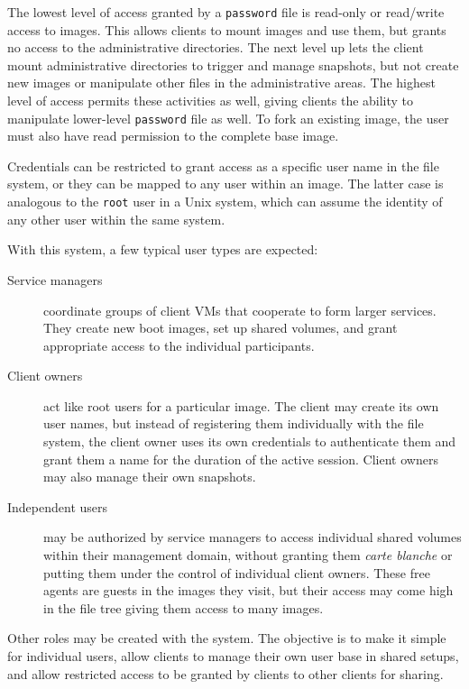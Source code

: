 The lowest level of access granted by a \texttt{password} file is read-only or read/write access to images. This allows clients to mount images and use them, but grants no access to the administrative directories. The next level up lets the client mount administrative directories to trigger and manage snapshots, but not create new images or manipulate other files in the administrative areas. The highest level of access permits these activities as well, giving clients the ability to manipulate lower-level \texttt{password} file as well. To fork an existing image, the user must also have read permission to the complete base image.

Credentials can be restricted to grant access as a specific user name in the file system, or they can be mapped to any user within an image. The latter case is analogous to the \texttt{root} user in a Unix system, which can assume the identity of any other user within the same system.

With this system, a few typical user types are expected:

\begin{description}
\item[Service managers] coordinate groups of client VMs that cooperate to form larger services. They create new boot images, set up shared volumes, and grant appropriate access to the individual participants.

\item[Client owners] act like root users for a particular image. The client may create its own user names, but instead of registering them individually with the file system, the client owner uses its own credentials to authenticate them and grant them a name for the duration of the active session. Client owners may also manage their own snapshots.

\item[Independent users] may be authorized by service managers to access individual shared volumes within their management domain, without granting them \emph{carte blanche} or putting them under the control of individual client owners. These free agents are guests in the images they visit, but their access may come high in the file tree giving them access to many images.
\end{description}

Other roles may be created with the system. The objective is to make it simple for individual users, allow clients to manage their own user base in shared setups, and allow restricted access to be granted by clients to other clients for sharing.

